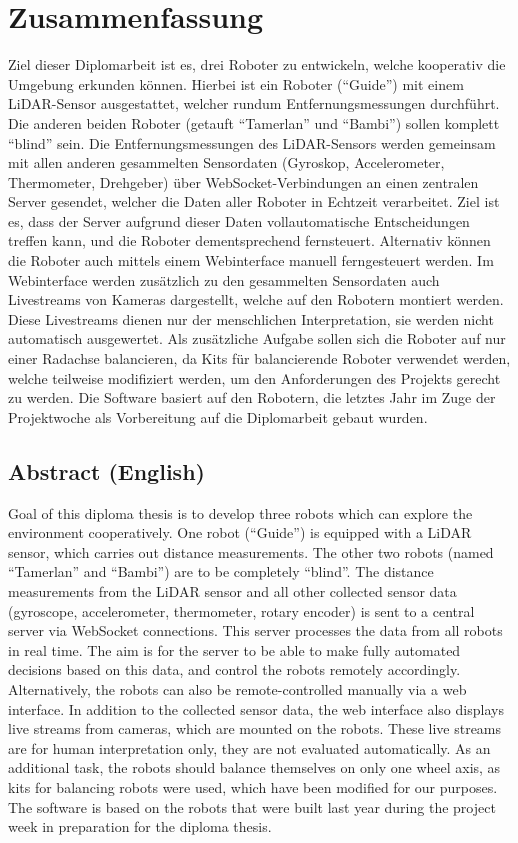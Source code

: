 
\chapter{Zusammenfassung}
Ziel dieser Diplomarbeit ist es, drei Roboter zu entwickeln,
welche kooperativ die Umgebung erkunden können.
%
Hierbei ist ein Roboter (``Guide'') mit einem LiDAR-Sensor ausgestattet,
welcher rundum Entfernungsmessungen durchführt.
%
Die anderen beiden Roboter (getauft ``Tamerlan'' und ``Bambi'')
sollen komplett ``blind'' sein.
%
Die Entfernungsmessungen des LiDAR-Sensors werden
gemeinsam mit allen anderen gesammelten Sensordaten
(Gyroskop, Accelerometer, Thermometer, Drehgeber)
über WebSocket-Verbindungen an einen zentralen Server gesendet,
welcher die Daten aller Roboter in Echtzeit verarbeitet.
%
Ziel ist es, dass der Server aufgrund dieser Daten
vollautomatische Entscheidungen treffen kann,
und die Roboter dementsprechend fernsteuert.
%
Alternativ können die Roboter auch mittels einem Webinterface manuell ferngesteuert werden.
%
Im Webinterface werden zusätzlich zu den gesammelten Sensordaten
auch Livestreams von Kameras dargestellt,
welche auf den Robotern montiert werden.
%
Diese Livestreams dienen nur der menschlichen Interpretation,
sie werden nicht automatisch ausgewertet.
%
Als zusätzliche Aufgabe sollen sich die Roboter auf nur einer Radachse balancieren,
da Kits für balancierende Roboter verwendet werden,
welche teilweise modifiziert werden,
um den Anforderungen des Projekts gerecht zu werden.
%
Die Software basiert auf den Robotern,
die letztes Jahr im Zuge der Projektwoche als Vorbereitung auf die Diplomarbeit gebaut wurden.

\section{Abstract (English)}
Goal of this diploma thesis is to develop three robots which
can explore the environment cooperatively.
%
One robot (``Guide'') is equipped with a LiDAR sensor,
which carries out distance measurements.
%
The other two robots (named ``Tamerlan'' and ``Bambi'')
are to be completely ``blind''.
%
The distance measurements from the LiDAR sensor and all other collected sensor data
(gyroscope, accelerometer, thermometer, rotary encoder)
is sent to a central server via WebSocket connections.
This server processes the data from all robots in real time.
%
The aim is for the server to be able to make fully automated decisions based on this data,
and control the robots remotely accordingly.
%
Alternatively, the robots can also be remote-controlled manually via a web interface.
%
In addition to the collected sensor data, the web interface
also displays live streams from cameras,
which are mounted on the robots.
%
These live streams are for human interpretation only,
they are not evaluated automatically.
%
As an additional task, the robots should balance themselves on only one wheel axis,
as kits for balancing robots were used,
which have been modified for our purposes.
The software is based on the robots
that were built last year during the project week in preparation for the diploma thesis.